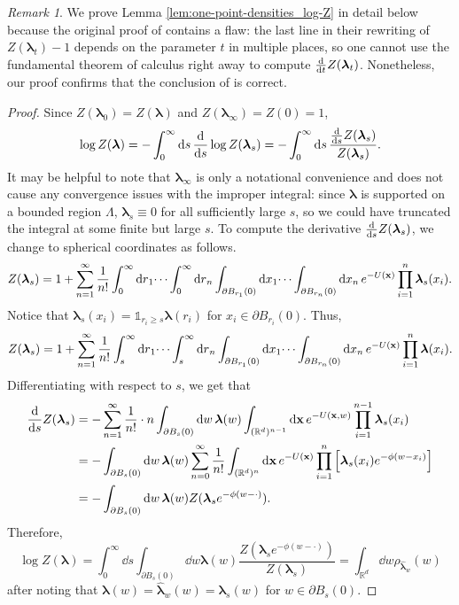\documentclass[11pt]{article}
\newcommand{\R}{\mathbb R}
\newcommand{\bl}{\bm{\lambda}}
\newcommand{\bx}{\vb{x}}
\newcommand{\indicator}[1]{\mathds{1}_{#1}}
\numberwithin{equation}{section}
\theoremstyle{plain}
\theoremstyle{definition}
\theoremstyle{remark}
\newtheorem{remark}[theorem]{Remark}
\begin{document}
\begin{remark}
We prove Lemma \ref{lem:one-point-densities_log-Z} in detail below because the original proof of \cite[Lemma 7]{michelen2023analyticity} contains a flaw: the last line in their rewriting of $Z(\bl_{t})-1$ depends on the parameter $t$ in multiple places, so one cannot use the fundamental theorem of calculus right away to compute $\dv{t}Z(\bl_{t})$.
Nonetheless, our proof confirms that the conclusion of \cite[Lemma 7]{michelen2023analyticity} is correct.
\end{remark}

\begin{proof}
Since $Z(\bl_{0})=Z(\bl)$ and $Z(\bl_{\infty})=Z(0)=1$,
\begin{equation}
\log Z(\bl)=-\int_{0}^{\infty}\dd{s}\dv{s}\log Z(\bl_{s})=-\int_{0}^{\infty}\dd{s}\frac{\dv{s}Z(\bl_{s})}{Z(\bl_{s})}.
\end{equation}
It may be helpful to note that $\bl_{\infty}$ is only a notational convenience and does not cause any convergence issues with the improper integral: since $\bl$ is supported on a bounded region $\Lambda$, $\bl_{s}\equiv 0$ for all sufficiently large $s$, so we could have truncated the integral at some finite but large $s$.
To compute the derivative $\dv{s}Z(\bl_{s})$, we change to spherical coordinates as follows.
\begin{equation}
Z(\bl_{s})=1+\sum_{n=1}^{\infty}\frac{1}{n!}\int_{0}^{\infty}\dd{r}_{1}\dots\int_{0}^{\infty}\dd{r}_{n}\int_{\partial B_{r_{1}}(0)}\dd{x}_{1}\dots\int_{\partial B_{r_{n}}(0)}\dd{x}_{n} e^{-U(\bx)}\prod_{i=1}^{n}\bl_{s}(x_{i}).
\end{equation}
Notice that $\bl_{s}(x_{i})=\indicator{r_{i}\ge s}\bl(r_{i})$ for $x_{i}\in\partial B_{r_{i}}(0)$.
Thus,
\begin{equation}
Z(\bl_{s})=1+\sum_{n=1}^{\infty}\frac{1}{n!}\int_{s}^{\infty}\dd{r}_{1}\dots\int_{s}^{\infty}\dd{r}_{n}\int_{\partial B_{r_{1}}(0)}\dd{x}_{1}\dots\int_{\partial B_{r_{n}}(0)}\dd{x}_{n} e^{-U(\bx)}\prod_{i=1}^{n}\bl(x_{i}).
\end{equation}
Differentiating with respect to $s$, we get that
\begin{equation}
\begin{split}
\dv{s}Z(\bl_{s}){}
&=-\sum_{n=1}^{\infty}\frac{1}{n!}\cdot n\int_{\partial B_{s}(0)}\dd{w}\bl(w)\int_{(\R^{d})^{n-1}}\dd{\vb{x}} e^{-U(\bx,w)}\prod_{i=1}^{n-1}\bl_{s}(x_{i}) \\
{}&=-\int_{\partial B_{s}(0)}\dd{w}\bl(w)\sum_{n=0}^{\infty}\frac{1}{n!}\int_{(\R^{d})^{n}}\dd{\vb{x}} e^{-U(\bx)}\prod_{i=1}^{n}\left[\bl_{s}(x_{i})e^{-\phi(w-x_{i})}\right] \\
{}&=-\int_{\partial B_{s}(0)}\dd{w}\bl(w)Z(\bl_{s}e^{-\phi(w-\cdot)}).
\end{split}
\end{equation}
Therefore,
\begin{equation}
\log Z(\bl)
=\int_{0}^{\infty}\dd{s}\int_{\partial B_{s}(0)}\dd{w}\bl(w)\frac{Z(\bl_{s}e^{-\phi(w-\cdot)})}{Z(\bl_{s})}
=\int_{\R^{d}}\dd{w}\rho_{\hat{\bl}_{w}}(w)
\end{equation}
after noting that $\bl(w)=\hat{\bl}_{w}(w)=\bl_{s}(w)$ for $w\in\partial B_{s}(0)$.
\end{proof}
\end{document}
